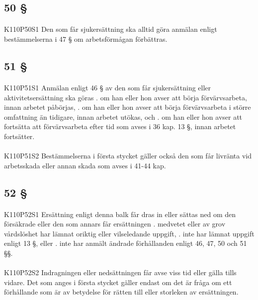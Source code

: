\documentclass[a4paper,notitlepage,openany,10pt]{book}
\begin{document}
\subsection*{50 §}
\paragraph*{}
{\tiny K110P50S1}
Den som får sjukersättning ska alltid göra anmälan enligt bestämmelserna i 47 § om arbetsförmågan förbättras.
\subsection*{51 §}
\paragraph*{}
{\tiny K110P51S1}
Anmälan enligt 46 § av den som får sjukersättning eller aktivitetsersättning ska göras
. om han eller hon avser att börja förvärvsarbeta, innan arbetet påbörjas,
. om han eller hon avser att börja förvärvsarbeta i större omfattning än tidigare, innan arbetet utökas, och
. om han eller hon avser att fortsätta att förvärvsarbeta efter tid som avses i 36 kap. 13 §, innan arbetet fortsätter.
\paragraph*{}
{\tiny K110P51S2}
Bestämmelserna i första stycket gäller också den som får livränta vid arbetsskada eller annan skada som avses i 41-44 kap.
\subsection*{52 §}
\paragraph*{}
{\tiny K110P52S1}
Ersättning enligt denna balk får dras in eller sättas ned om den försäkrade eller den som annars får ersättningen
. medvetet eller av grov vårdslöshet har lämnat oriktig eller vilseledande uppgift,
. inte har lämnat uppgift enligt 13 §, eller
. inte har anmält ändrade förhållanden enligt 46, 47, 50 och 51 §§.
\paragraph*{}
{\tiny K110P52S2}
Indragningen eller nedsättningen får avse viss tid eller gälla tills vidare. Det som anges i första stycket gäller endast om det är fråga om ett förhållande som är av betydelse för rätten till eller storleken av ersättningen.
\end{document}
